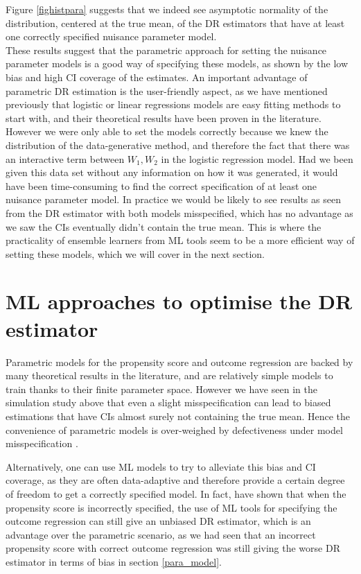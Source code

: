 \documentclass[12pt,twoside]{article}
\begin{document}
Figure \ref{fighistpara} suggests that we indeed see asymptotic normality of the distribution, centered at the true mean, of the DR estimators that have at least one correctly specified nuisance parameter model.\\

These results suggest that the parametric approach for setting the nuisance parameter models is a good way of specifying these models, as shown by the low bias and high CI coverage of the estimates. An important advantage of parametric DR estimation is the user-friendly aspect, as we have mentioned previously that logistic or linear regressions models are easy fitting methods to start with, and their theoretical results have been proven in the literature. However we were only able to set the models correctly because we knew the distribution of the data-generative method, and therefore the fact that there was an interactive term between $W_1,W_2$ in the logistic regression model. Had we been given this data set without any information on how it was generated, it would have been time-consuming to find the correct specification of at least one nuisance parameter model. In practice we would be likely to see results as seen from the DR estimator with both models misspecified, which has no advantage as we saw the CIs eventually didn't contain the true mean. This is where the practicality of ensemble learners from ML tools seem to be a more efficient way of setting these models, which we will cover in the next section.

\clearpage
\section{ML approaches to optimise the DR estimator}

Parametric models for the propensity score and outcome regression are backed by many theoretical results in the literature, and are relatively simple models to train thanks to their finite parameter space. However we have seen in the simulation study above that even a slight misspecification can lead to biased estimations that have CIs almost surely not containing the true mean. Hence the convenience of parametric models is over-weighed by defectiveness under model misspecification \citep{diaz}.

Alternatively, one can use ML models to try to alleviate this bias and CI coverage, as they are often data-adaptive and therefore provide a certain degree of freedom to get a correctly specified model. In fact, \citet{ps_SL} have shown that when the propensity score is incorrectly specified, the use of ML tools for specifying the outcome regression can still give an unbiased DR estimator, which is an advantage over the parametric scenario, as we had seen that an incorrect propensity score with correct outcome regression was still giving the worse DR estimator in terms of bias in section \ref{para_model}.
\end{document}
